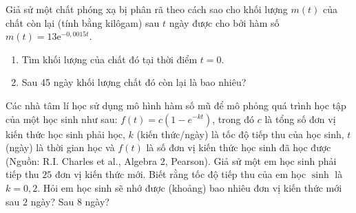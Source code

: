 \begin{bt}%
	Giả sử một chất phóng xạ bị phân rã theo cách sao cho khối lượng $m(t)$ của chất còn lại (tính bằng kilôgam) sau $t$ ngày được cho bởi hàm số $m(t) = 13 \mathrm{e}^{-0,0015t}$.
	\begin{enumerate}
		\item Tìm khối lượng của chất đó tại thời điểm $t = 0$.
		\item Sau 45 ngày khối lượng chất đó còn lại là bao nhiêu?
	\end{enumerate}
\end{bt}

\begin{bt}%
	Các nhà tâm lí học sử dụng mô hình hàm số mũ để mô phỏng quá trình học tập của một học sinh như sau: $f(t)=c\left(1-e^{-k t}\right)$, trong đó $c$ là tổng số đơn vị kiến thức học sinh phải học, $k$ (kiến thức/ngày) là tốc độ tiếp thu của học sinh, $t$ (ngày) là thời gian học và $f(t)$ là số đơn vị kiến thức học sinh đã học được (Nguồn: R.I. Charles et al., Algebra 2, Pearson). Giả sử một em học sinh phải tiếp thu $25$ đơn vị kiến thức mới. Biết rằng tốc độ tiếp thu của em học $\sinh$ là $k=0{,}2$. Hỏi em học sinh sẽ nhớ được (khoảng) bao nhiêu đơn vị kiến thức mới sau $2$ ngày? Sau $8$ ngày?
\end{bt}

